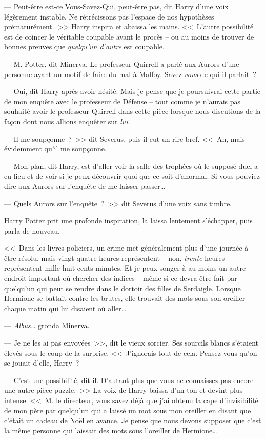 --- Peut-être est-ce Vous-Savez-Qui, peut-être pas, dit Harry d'une voix légèrement instable. Ne rétrécissons pas l'espace de nos hypothèses prématurément.~>> Harry inspira et abaissa les mains. <<~L'autre possibilité est de coincer le véritable coupable avant le procès -- ou au moins de trouver de bonnes preuves que \emph{quelqu'un d'autre} est coupable.

--- M. Potter, dit Minerva. Le professeur Quirrell a parlé aux Aurors d'une personne ayant un motif de faire du mal à Malfoy. Savez-\emph{vous} de qui il parlait~?

--- Oui, dit Harry après avoir hésité. Mais je pense que je poursuivrai cette partie de mon enquête avec le professeur de Défense -- tout comme je n'aurais pas souhaité avoir le professeur Quirrell dans cette pièce lorsque nous discutions de la façon dont nous allions enquêter sur \emph{lui}.

--- Il me soupçonne~?~>> dit Severus, puis il eut un rire bref. <<~Ah, mais évidemment qu'il me soupçonne.

--- Mon plan, dit Harry, est d'aller voir la salle des trophées où le supposé duel a eu lieu et de voir si je peux découvrir quoi que ce soit d'anormal. Si vous pouviez dire aux Aurors sur l'enquête de me laisser passer…

--- Quels Aurors sur l'enquête~?~>> dit Severus d'une voix sans timbre.

Harry Potter prit une profonde inspiration, la laissa lentement s'échapper, puis parla de nouveau.

<<~Dans les livres policiers, un crime met généralement plus d'une journée à être résolu, mais vingt-quatre heures représentent -- non, \emph{trente} heures représentent mille-huit-cents minutes. Et je peux songer à au moins un autre endroit important où chercher des indices -- même si ce devra être fait par quelqu'un qui peut se rendre dans le dortoir des filles de Serdaigle. Lorsque Hermione se battait contre les brutes, elle trouvait des mots sous son oreiller chaque matin qui lui disaient où aller…

--- \emph{Albus…} gronda Minerva.

--- Je ne les ai pas envoyées~>>, dit le vieux sorcier. Ses sourcils blancs s'étaient élevés sous le coup de la surprise. <<~J'ignorais tout de cela. Pensez-vous qu'on se jouait d'elle, Harry~?

--- C'est une possibilité, dit-il. D'autant plus que vous ne connaissez pas encore une autre pièce puzzle.~>> La voix de Harry baissa d'un ton et devint plus intense. <<~M. le directeur, vous savez déjà que j'ai obtenu la cape d'invisibilité de mon père par quelqu'un qui a laissé un mot sous mon oreiller en disant que c'était un cadeau de Noël en avance. Je pense que nous devons supposer que c'est la même personne qui laissait des mots sous l'oreiller de Hermione…

